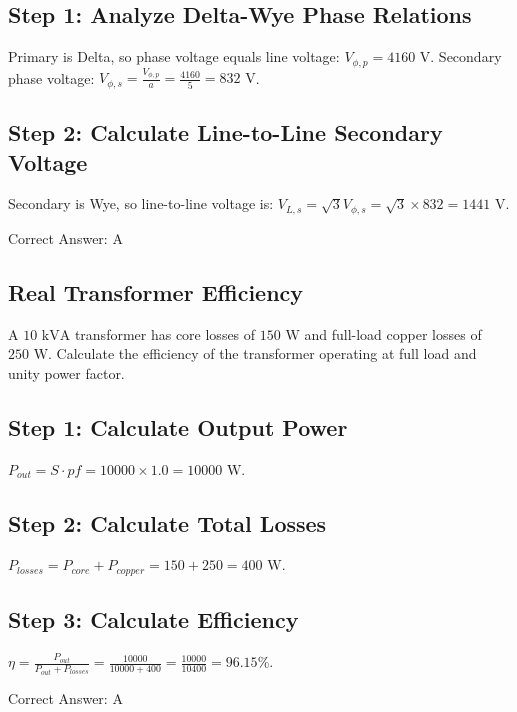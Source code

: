 \begin{solution}

\subsection*{Step 1: Analyze Delta-Wye Phase Relations}
Primary is Delta, so phase voltage equals line voltage: $V_{\phi,p} = 4160\text{ V}$.
Secondary phase voltage: $V_{\phi,s} = \frac{V_{\phi,p}}{a} = \frac{4160}{5} = 832\text{ V}$.

\subsection*{Step 2: Calculate Line-to-Line Secondary Voltage}
Secondary is Wye, so line-to-line voltage is: $V_{L,s} = \sqrt{3} V_{\phi,s} = \sqrt{3} \times 832 = 1441\text{ V}$.

Correct Answer: A
\end{solution}

\clearpage

\subsection{Real Transformer Efficiency}

A $10\text{ kVA}$ transformer has core losses of $150\text{ W}$ and full-load copper losses of $250\text{ W}$. Calculate the efficiency of the transformer operating at full load and unity power factor.

\begin{choices}
\end{choices}

\begin{solution}

\subsection*{Step 1: Calculate Output Power}
$P_{out} = S \cdot pf = 10000 \times 1.0 = 10000\text{ W}$.

\subsection*{Step 2: Calculate Total Losses}
$P_{losses} = P_{core} + P_{copper} = 150 + 250 = 400\text{ W}$.

\subsection*{Step 3: Calculate Efficiency}
$\eta = \frac{P_{out}}{P_{out} + P_{losses}} = \frac{10000}{10000 + 400} = \frac{10000}{10400} = 96.15\%$.

Correct Answer: A
\end{solution}

